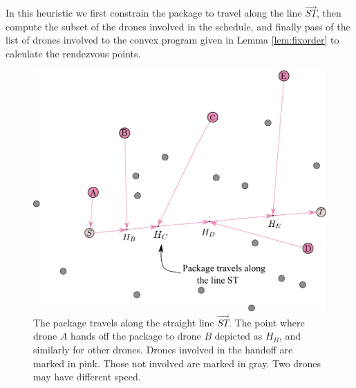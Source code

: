 \documentclass[12pt, english, oneside]{report}
\begin{document}
In this heuristic we first constrain the package to travel along the line $\vec{ST}$, then compute the 
subset of the drones involved in the schedule, and finally pass of the list of drones involved to the convex
program given in Lemma \autoref{lem:fixorder} to calculate the rendezvous points. 


\begin{figure}[H]
\centering
   \includegraphics[width=14cm]{docs/straight-line-pho-ex.pdf}
    \caption{The package travels along the straight line $\vec{ST}$. The point where drone $A$ hands off the 
     package to drone $B$ depicted as $H_B$, and similarly for other drones. Drones involved in the handoff 
     are marked in pink. Those not involved are marked in gray. Two drones may have different speed.}
\end{figure}
\end{document}
